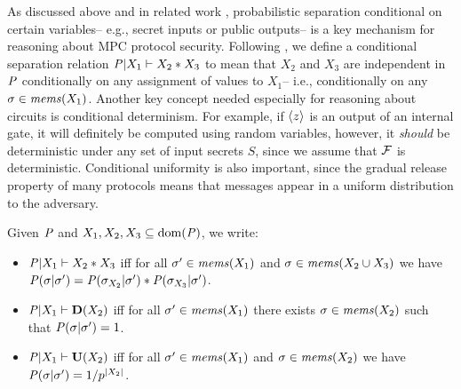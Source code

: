 As discussed above and in related work \cite{8429300}, probabilistic
separation conditional on certain variables-- e.g., secret inputs or
public outputs-- is a key mechanism for reasoning about MPC protocol
security. Following \cite{barthe2019probabilistic}, we define a
conditional separation relation $\mathit{P}|X_1 \vdash X_2 * X_3$ to
mean that $X_2$ and $X_3$ are independent in $\mathit{P}$ conditionally on
any assignment of values to $X_1$-- i.e., conditionally on any $\sigma
\in \mathit{mems}(X_1)$. Another key concept needed especially for reasoning
about circuits is conditional determinism. For example, if $\langle z \rangle$
is an output of an internal gate, it will definitely be computed using
random variables, however, it \emph{should} be deterministic under any
set of input secrets $S$, since we assume that $\mathcal{F}$ is
deterministic. Conditional uniformity is also important, since the
gradual release property of many protocols means that messages appear
in a uniform distribution to the adversary.
\begin{definition} 
  Given $\mathit{P}$ and $X_1,X_2,X_3 \subseteq \mathrm{dom}(\mathit{P})$, 
  we write:
  \begin{itemize}
  \item $\mathit{P}|X_1 \vdash X_2 * X_3$ iff for all
    $\sigma' \in \mathit{mems}(X_1)$ and $\sigma \in \mathit{mems}(X_2 \cup X_3)$ we have
    $\mathit{P}(\sigma|\sigma') = \mathit{P}(\sigma_{X_2}|\sigma') *  \mathit{P}(\sigma_{X_3}|\sigma')$.
  \item $\mathit{P}|X_1 \vdash \mathbf{D}(X_2)$ iff for all
    $\sigma' \in \mathit{mems}(X_1)$ there exists 
    $\sigma \in \mathit{mems}(X_2)$ such that $\mathit{P}(\sigma|\sigma') = 1$.
  \item $\mathit{P}|X_1 \vdash \mathbf{U}(X_2)$ iff for all
    $\sigma' \in \mathit{mems}(X_1)$ and
    $\sigma \in \mathit{mems}(X_2)$ we have
    $\mathit{P}(\sigma|\sigma') = 1/p^{|X_2|}$.
  \end{itemize}
\end{definition}

